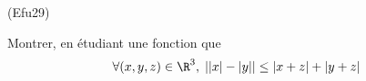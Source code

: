 \begin{tiny}(Efu29)\end{tiny} Montrer, en étudiant une fonction que
\begin{displaymath}
\forall (x,y,z)\in \R^3, \;
\left| |x| - |y| \right| \leq | x+ z| + |y+z|
\end{displaymath}
